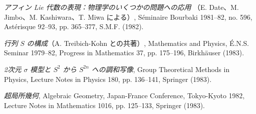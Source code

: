 \begin{description}
\item[{[33]}] \emph{アフィン Lie 代数の表現：物理学のいくつかの問題への応用}
（E. Date、M. Jimbo、M. Kashiwara、T. Miwa による）, Séminaire
Bourbaki 1981--82, no. 596, Astérisque 92--93, pp. 365--377,
S.M.F. (1982).

\item[{[34]}] \emph{行列 $S$ の構成}（A. Treibich-Kohn との共著）,
Mathematics and Physics, É.N.S. Seminar 1979--82, Progress in Mathematics
37, pp. 175--196, Birkhäuser (1983).

\item[{[35]}] \emph{2次元 $\sigma$ 模型と $S^2$ から $S^{2n}$ への調和写像},
Group Theoretical Methods in Physics, Lecture Notes in Physics 180,
pp. 136--141, Springer (1983).

\item[{[36]}] \emph{超局所幾何}, Algebraic Geometry, Japan-France
Conference, Tokyo-Kyoto 1982, Lecture Notes in Mathematics 1016,
pp. 125--133, Springer (1983).
\end{description}
\normalsize
